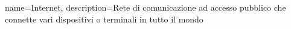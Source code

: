 {
	name={Internet},
	description={Rete di comunicazione ad accesso pubblico che connette vari dispositivi o terminali in tutto il mondo}
}